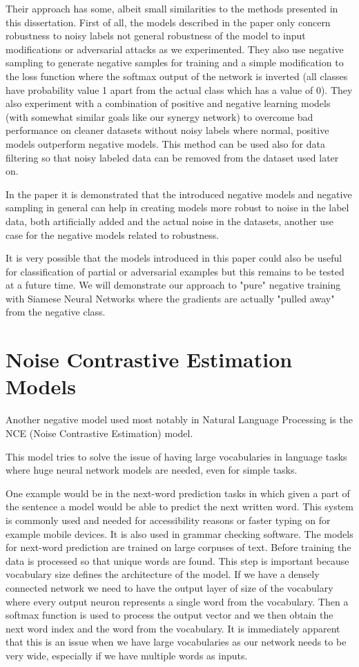 \documentclass[b5paper]{book}
\let\cite\parencite
\begin{document}
Their approach has some, albeit small similarities to the methods presented in this dissertation. First of all, the models described in the paper only concern robustness to noisy labels not general robustness of the model to input modifications or adversarial attacks as we experimented. They also use negative sampling to generate negative samples for training and a simple modification to the loss function where the softmax output of the network is inverted (all classes have probability value 1 apart from the actual class which has a value of 0). They also experiment with a combination of positive and negative learning models (with somewhat similar goals like our synergy network) to overcome bad performance on cleaner datasets without noisy labels where normal, positive models outperform negative models. This method can be used also for data filtering so that noisy labeled data can be removed from the dataset used later on.

In the paper it is demonstrated that the introduced negative models and negative sampling in general can help in creating models more robust to noise in the label data, both artificially added and the actual noise in the datasets, another use case for the negative models related to robustness.

It is very possible that the models introduced in this paper could also be useful for classification of partial or adversarial examples but this remains to be tested at a future time. We will demonstrate our approach to "pure" negative training with Siamese Neural Networks where the gradients are actually "pulled away" from the negative class.

\section{Noise Contrastive Estimation Models}

Another negative model used most notably in Natural Language Processing is the NCE (Noise Contrastive Estimation) \cite{mnih2013learning} model.

This model tries to solve the issue of having large vocabularies in language tasks where huge neural network models are needed, even for simple tasks. 

One example would be in the next-word prediction tasks in which given a part of the sentence a model would be able to predict the next written word. This system is commonly used and needed for accessibility reasons or faster typing on for example mobile devices. It is also used in grammar checking software. The models for next-word prediction are trained on large corpuses of text. Before training the data is processed so that unique words are found. This step is important because vocabulary size defines the architecture of the model. If we have a densely connected network we need to have the output layer of size of the vocabulary where every output neuron represents a single word from the vocabulary. Then a softmax function is used to process the output vector and we then obtain the next word index and the word from the vocabulary. It is immediately apparent that this is an issue when we have large vocabularies as our network needs to be very wide, especially if we have multiple words as inputs. 
\end{document}
